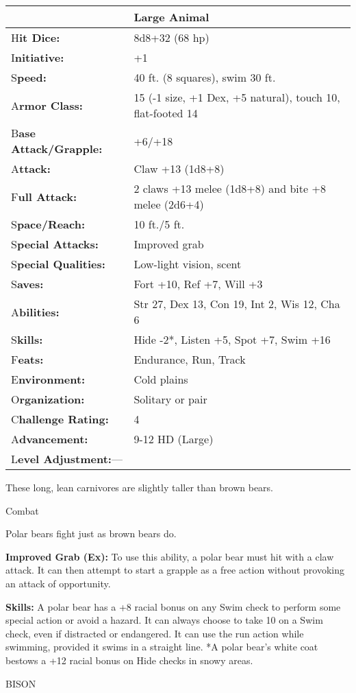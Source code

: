 \documentclass{article}
\begin{document}
\begin{tabular}{|>{\raggedright}p{91pt}|>{\raggedright}p{226pt}|}
\hline
  & Large Animal\tabularnewline
\hline
H\textbf{it Dice:} & 8d8+32 (68 hp)\tabularnewline
\hline
I\textbf{nitiative:} & +1\tabularnewline
\hline
S\textbf{peed:} & 40 ft. (8 squares), swim 30 ft.\tabularnewline
\hline
A\textbf{rmor Class:} & 15 (-1 size, +1 Dex, +5 natural), touch 10, flat-footed 
14\tabularnewline
\hline
B\textbf{ase Attack/Grapple:} & +6/+18\tabularnewline
\hline
A\textbf{ttack:} & Claw +13 (1d8+8)\tabularnewline
\hline
F\textbf{ull Attack:} & 2 claws +13 melee (1d8+8) and bite +8 melee (2d6+4)\tabularnewline
\hline
S\textbf{pace/Reach:} & 10 ft./5 ft.\tabularnewline
\hline
S\textbf{pecial Attacks:} & Improved grab\tabularnewline
\hline
S\textbf{pecial Qualities:} & Low-light vision, scent\tabularnewline
\hline
S\textbf{aves:} & Fort +10, Ref +7, Will +3\tabularnewline
\hline
A\textbf{bilities:} & Str 27, Dex 13, Con 19, Int 2, Wis 12, Cha 6\tabularnewline
\hline
S\textbf{kills:} & Hide -2*, Listen +5, Spot +7, Swim +16\tabularnewline
\hline
F\textbf{eats:} & Endurance, Run, Track\tabularnewline
\hline
E\textbf{nvironment:} & Cold plains\tabularnewline
\hline
O\textbf{rganization:} & Solitary or pair\tabularnewline
\hline
C\textbf{hallenge Rating:} & 4\tabularnewline
\hline
A\textbf{dvancement:} & 9-12 HD (Large)\tabularnewline
\hline
L\textbf{evel Adjustment:}--- & \tabularnewline
\hline
\end{tabular}

These long, lean carnivores are slightly taller than brown bears.

Combat

Polar bears fight just as brown bears do.

\textbf{Improved Grab (Ex):} To use this ability, a polar bear must hit with a 
claw attack. It can then attempt to start a grapple as a free action without provoking 
an attack of opportunity.

\textbf{Skills:} A polar bear has a +8 racial bonus on any Swim check to perform 
some special action or avoid a hazard. It can always choose to take 10 on a Swim 
check, even if distracted or endangered. It can use the run action while swimming, 
provided it swims in a straight line. *A polar bear's white coat bestows a +12 
racial bonus on Hide checks in snowy areas.

\vspace{12pt}
BISON
\end{document}
